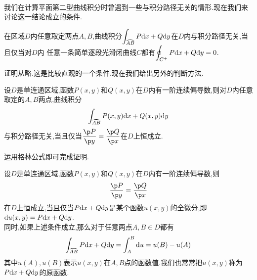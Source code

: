 \documentclass{ctexart}
\begin{document}
\\
我们在计算平面第二型曲线积分时曾遇到一些与积分路径无关的情形.现在我们来讨论这一结论成立的条件.
\begin{formal}[3.1 第二型曲线积分与路径无关的条件I]
    在区域$D$内任意取定两点$A,B$,曲线积分$\displaystyle\int_{\wideparen{AB}}P\di x+Q\di y$在$D$内与积分路径无关,当且仅当对$D$内%
    任意一条简单逐段光滑闭曲线$C$都有$\displaystyle\oint_{C^+}P\mathrm{d} x+Q\mathrm{d} y=0$.
\end{formal}\noindent
证明从略.这是比较直观的一个条件.现在我们给出另外的判断方法.
\begin{formal}[3.2 第二型曲线积分与路径无关的条件II]
    设$D$是单连通区域,函数$P(x,y)$和$Q(x,y)$在$D$内有一阶连续偏导数,则对$D$内任意取定的$A,B$两点,曲线积分
    \[\int_{\wideparen{AB}}P(x,y)\di x+Q(x,y)\di y\]
    与积分路径无关,当且仅当$\dfrac{\p P}{\p y}=\dfrac{\p Q}{\p x}$在$D$上恒成立.
\end{formal}\noindent
运用格林公式即可完成证明.
\begin{formal}[3.3 第二型曲线积分与路径无关的条件III]
    设$D$是单连通区域,函数$P(x,y)$和$Q(x,y)$在$D$内有一阶连续偏导数,则
    \[\dfrac{\p P}{\p y}=\dfrac{\p Q}{\p x}\]
    在$D$上恒成立,当且仅当$P\mathrm{d} x+Q\mathrm{d} y$是某个函数$u(x,y)$的全微分,即$\mathrm{d} u(x,y)=P\mathrm{d} x+Q\mathrm{d} y$.\\
    同时,如果上述条件成立,那么对于任意两点$A,B\in D$都有
    \[\int_{\wideparen{AB}}P\di x+Q\di y=\int_{A}^{B}\di u=u(B)-u(A)\]
    其中$u(A),u(B)$表示$u(x,y)$在$A,B$点的函数值.我们也常常把$u(x,y)$称为$P\mathrm{d} x+Q\mathrm{d} y$的原函数.
\end{formal}
\end{document}
